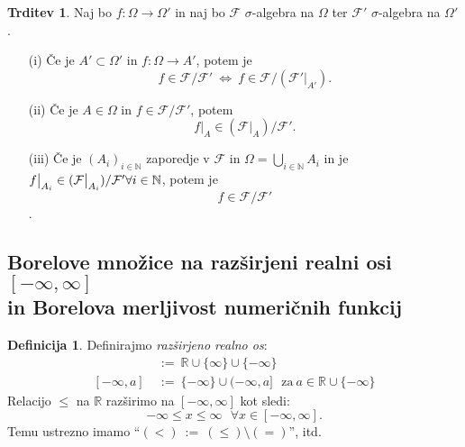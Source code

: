 \documentclass[11pt]{article}
\newcommand{\R}{\mathbb{R}}
\newcommand{\N}{\mathbb{N}}
\newcommand{\F}{\mathcal{F}}
\newcommand{\set}[1]{\{#1\}}
\newcommand{\1}{\mathbbm{1}}
\newcommand{\rr}{[-\infty,\infty]}
\theoremstyle{definition}
\newtheorem{definicija}{Definicija}[section]
\theoremstyle{definition}
\newtheorem{trditev}{Trditev}[section]
\theoremstyle{definition}
\theoremstyle{definition}
\begin{document}
\begin{trditev}

Naj bo $f: \Omega \rightarrow \Omega'$ in naj bo $\F$ $\sigma$-algebra na $\Omega$ ter $\F'$ $\sigma$-algebra na $\Omega'$.
\begin{enumerate}

\item[(i)] Če je $A' \subset \Omega'$ in $f: \Omega \rightarrow A'$, potem je 
$$f \in \F/\F' ~\iff~ f \in \F/(\F' \big|_{A'}).$$

\item[(ii)] Če je $A \in \Omega$ in $f \in \F/\F'$, potem
$$f\big|_A \in (\F\big|_A)/\F'.$$

\item[(iii)] Če je $(A_i)_{i \in \N}$ zaporedje v $\F$ in $\Omega = \bigcup_{i \in \N} A_i$ in je $f\big|_{A_i} \in (\F\big|_{A_i})/\F' \\\forall i \in \N$, potem je
$$f \in \F/\F'$$.

\end{enumerate}

\end{trditev}
\vspace{0.5cm}


\subsection{Borelove množice na razširjeni realni osi $[-\infty,\infty]$ \\in Borelova merljivost numeričnih funkcij}
\vspace{0.5cm}

\begin{definicija}

Definirajmo \textit{razširjeno realno os}:
\begin{align*}
\rr ~&:=~ \R \cup \set{\infty} \cup \set{-\infty} \\
[-\infty, a] ~&:=~ \set{-\infty} \cup (-\infty,a] ~~~\text{za}~ a \in \R \cup \set{-\infty}
\end{align*}
Relacijo $\leq$ na $\R$ razširimo na $[-\infty,\infty]$ kot sledi:
$$-\infty \leq x \leq \infty ~~~\forall x \in \rr.$$
Temu ustrezno imamo ``$(<) ~:=~ (\leq) \setminus (=)$'', itd.

\end{definicija}
\vspace{0.5cm}
\end{document}

